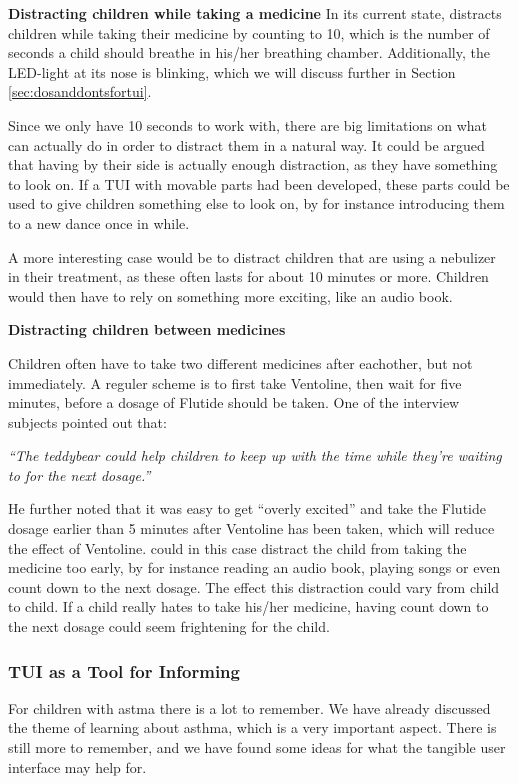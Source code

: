 \textbf{Distracting children while taking a medicine}
In its current state, \ab{} distracts children while taking their medicine by counting to 10, which is the number of seconds a child should breathe in his/her breathing chamber. Additionally, the LED-light at its nose is blinking, which we will discuss further in Section \ref{sec:dosanddontsfortui}. 

Since we only have 10 seconds to work with, there are big limitations on what \ab{} can actually do in order to distract them in a natural way. It could be argued that having \ab{} by their side is actually enough distraction, as they have something to look on. If a TUI with movable parts had been developed, these parts could be used to give children something else to look on, by for instance introducing them to a new dance once in while.        

A more interesting case would be to distract children that are using a nebulizer in their treatment, as these often lasts for about 10 minutes or more. Children would then have to rely on something more exciting, like an audio book. 

\textbf{Distracting children between medicines}

Children often have to take two different medicines after eachother, but not immediately. A reguler scheme is to first take Ventoline, then wait for five minutes, before a dosage of Flutide should be taken. One of the interview subjects pointed out that: 

\textit{``The teddybear could help children to keep up with the time while they're waiting to for the next dosage.''}

He further noted that it was easy to get ``overly excited'' and take the Flutide dosage earlier than 5 minutes after Ventoline has been taken, which will reduce the effect of Ventoline. \ab{} could in this case distract the child from taking the medicine too early, by for instance reading an audio book, playing songs or even count down to the next dosage. The effect this distraction could vary from child to child. If a child really hates to take his/her medicine, having \ab{} count down to the next dosage could seem frightening for the child.   
  

\subsubsection{TUI as a Tool for Informing}
\label{sec:tuiasatoolforinforming}
For children with astma there is a lot to remember. We have already discussed the theme of learning about asthma, which is a very important aspect. There is still more to remember, and we have found some ideas for what the tangible user interface may help for. 

